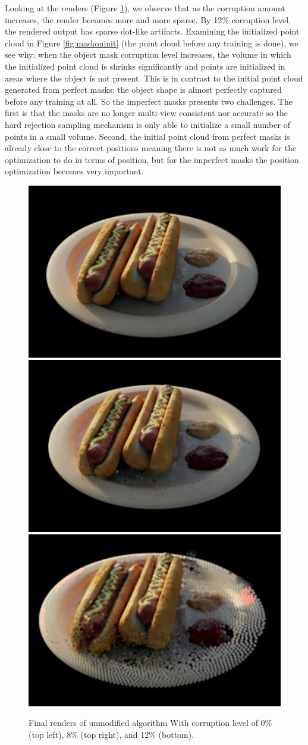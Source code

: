 \documentclass[10pt,twocolumn,letterpaper]{article}
\begin{document}
Looking at the renders (Figure \ref{fig:corruptrenders}), we observe that as the corruption amount increases, the render becomes more and more sparse. By 12\% corruption level, the rendered output has sparse dot-like artifacts. Examining the initialized point cloud in Figure \ref{fig:maskoninit} (\ie the point cloud before any training is done), we see why: when the object mask corruption level increases, the volume in which the initialized point cloud is shrinks significantly and points are initialized in areas where the object is not present. This is in contrast to the initial point cloud generated from perfect masks: the object shape is almost perfectly captured before any training at all. So the imperfect masks presents two challenges. The first is that the masks are no longer multi-view consistent nor accurate so the hard rejection sampling mechanism is only able to initialize a small number of points in a small volume. Second, the initial point cloud from perfect masks is already close to the correct positions meaning there is not as much work for the optimization to do in terms of position, but for the imperfect masks the position optimization becomes very important.

\begin{figure}[h]
\centering
    \includegraphics[width=0.45\linewidth]{figures/renderog.png}
    \includegraphics[width=0.45\linewidth]{figures/render8c.png} 
    \includegraphics[width=0.45\linewidth]{figures/render12c.png} 
    \caption{Final renders of unmodified algorithm With corruption level of 0\% (top left), 8\% (top right), and 12\% (bottom). }
\label{fig:corruptrenders}
\end{figure}
\end{document}
